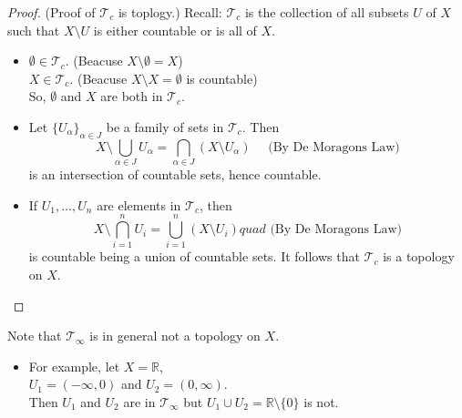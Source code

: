 \documentclass[
]{book}
\providecommand{\tightlist}{%
  \setlength{\itemsep}{0pt}\setlength{\parskip}{0pt}}
\theoremstyle{definition}
\theoremstyle{definition}
\theoremstyle{definition}
\theoremstyle{definition}
\theoremstyle{remark}
\begin{document}
\begin{proof}

(Proof of \(\mathcal{T}_c\) is toplogy.)
Recall: \(\mathcal{T}_c\) is the collection of all subsets \(U\) of \(X\) such that \(X \setminus U\) is either countable or is all of \(X\).

\begin{itemize}
\item
  \(\emptyset\in \mathcal{T}_c\). (Beacuse \(X\setminus \emptyset=X\))\\
  \(X \in \mathcal{T}_c\). (Beacuse \(X\setminus X=\emptyset\) is countable)\\
  So, \(\emptyset\) and \(X\) are both in \(\mathcal{T}_c\).
\item
  Let \(\{U_\alpha\}_{\alpha \in J}\) be a family of sets in \(\mathcal{T}_c\). Then
  \[X \setminus \bigcup_{\alpha \in J} U_\alpha = \bigcap_{\alpha \in J} (X \setminus U_\alpha)\quad\text{ (By De Moragons Law)}\]
  is an intersection of countable sets, hence countable.
\item
  If \(U_1, \ldots, U_n\) are elements in \(\mathcal{T}_c\), then
  \[X \setminus \bigcap_{i=1}^{n} U_i = \bigcup_{i=1}^{n} (X \setminus U_i)quad\text{ (By De Moragons Law)}\]
  is countable being a union of countable sets. It follows that \(\mathcal{T}_c\) is a topology on \(X\).
\end{itemize}

\end{proof}

Note that \(\mathcal{T}_\infty\) is in general not a topology on \(X\).

\begin{itemize}
\tightlist
\item
  For example, let \(X = \mathbb{R}\),\\
  \(U_1 = (-\infty, 0)\) and \(U_2 = (0, \infty)\).\\
  Then \(U_1\) and \(U_2\) are in \(\mathcal{T}_\infty\) but \(U_1 \cup U_2 = \mathbb{R} \setminus \{0\}\) is not.
\end{itemize}
\end{document}
